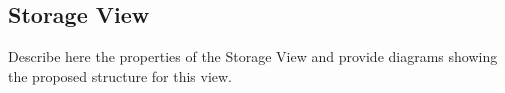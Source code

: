 \subsection{Storage View}

Describe here the properties of the Storage View and provide diagrams showing the proposed structure for this view.